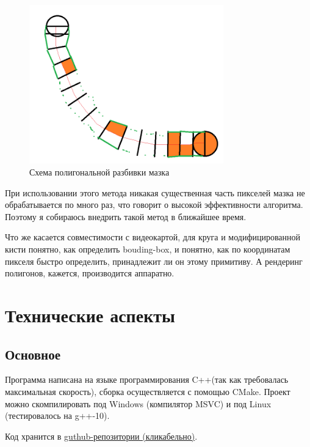 \documentclass[11pt]{article}
\begin{document}
\begin{itemize}
        \begin{figure}
            \centering
            \includegraphics[width=0.75\textwidth]{polygonal_stroke.png}
            \caption{Схема полигональной разбивки мазка}
            \label{fig:polygonal_stroke}
        \end{figure}

        При использовании этого метода никакая существенная часть пикселей мазка не обрабатывается по много раз, что говорит о высокой эффективности алгоритма.
        Поэтому я собираюсь внедрить такой метод в ближайшее время.
    \end{itemize}

    Что же касается совместимости с видеокартой,
    для круга и модифицированной кисти понятно, как определить bouding-box,
    и понятно, как по координатам пикселя быстро определить, принадлежит ли он этому примитиву.
    А рендеринг полигонов, кажется, производится аппаратно.

    \section{Технические аспекты}\label{sec:tecnical}

    \subsection{Основное}\label{subsec:major}
    Программа написана на языке программирования C++(так как требовалась максимальная скорость), сборка осуществляется с помощью CMake.
    Проект можно скомпилировать под Windows (компилятор MSVC) и под Linux (тестировалось на g++-10).

    Код хранится в \href{https://github.com/donRumata03/Painter}{guthub-репозитории (кликабельно)}.
\end{document}
